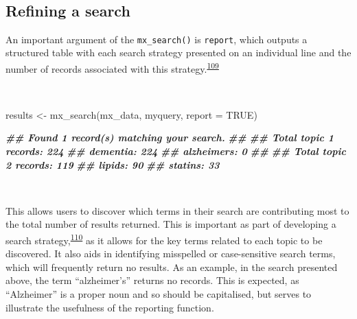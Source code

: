 \documentclass[a4paper, twoside]{templates/ociamthesis}
\newenvironment{Shaded}{\begin{snugshade}}{\end{snugshade}}
\newcommand{\AttributeTok}[1]{\textcolor[rgb]{0.77,0.63,0.00}{#1}}
\newcommand{\ConstantTok}[1]{\textcolor[rgb]{0.00,0.00,0.00}{#1}}
\newcommand{\DocumentationTok}[1]{\textcolor[rgb]{0.56,0.35,0.01}{\textbf{\textit{#1}}}}
\newcommand{\FunctionTok}[1]{\textcolor[rgb]{0.00,0.00,0.00}{#1}}
\newcommand{\NormalTok}[1]{#1}
\newcommand{\OtherTok}[1]{\textcolor[rgb]{0.56,0.35,0.01}{#1}}
\renewenvironment{Shaded}
{
  \vspace{4pt}%
  \begin{snugshade}%
}{%
  \end{snugshade}%
  \vspace{4pt}%
}
\begin{document}
~

\hypertarget{refining-a-search}{%
\subsection{Refining a search}\label{refining-a-search}}

An important argument of the \texttt{mx\_search()} is \texttt{report}, which outputs a structured table with each search strategy presented on an individual line and the number of records associated with this strategy.\textsuperscript{\protect\hyperlink{ref-rethlefsen2021prisma}{109}}

~

\begin{Shaded}
\begin{Highlighting}[]
\NormalTok{results  }\OtherTok{\textless{}{-}} \FunctionTok{mx\_search}\NormalTok{(mx\_data,}
\NormalTok{                      myquery,}
                      \AttributeTok{report =} \ConstantTok{TRUE}\NormalTok{)}
\end{Highlighting}
\end{Shaded}

\begin{Shaded}
\begin{Highlighting}[]
\DocumentationTok{\#\# Found 1 record(s) matching your search.}
\DocumentationTok{\#\# }
\DocumentationTok{\#\# Total topic 1 records: 224}
\DocumentationTok{\#\# dementia: 224}
\DocumentationTok{\#\# alzheimer\textquotesingle{}s: 0}
\DocumentationTok{\#\# }
\DocumentationTok{\#\# Total topic 2 records: 119}
\DocumentationTok{\#\# lipids: 90}
\DocumentationTok{\#\# statins: 33}
\end{Highlighting}
\end{Shaded}

~

This allows users to discover which terms in their search are contributing most to the total number of results returned. This is important as part of developing a search strategy,\textsuperscript{\protect\hyperlink{ref-bramer2018}{110}} as it allows for the key terms related to each topic to be discovered. It also aids in identifying misspelled or case-sensitive search terms, which will frequently return no results. As an example, in the search presented above, the term ``alzheimer's'' returns no records. This is expected, as ``Alzheimer'' is a proper noun and so should be capitalised, but serves to illustrate the usefulness of the reporting function.

~
\end{document}
